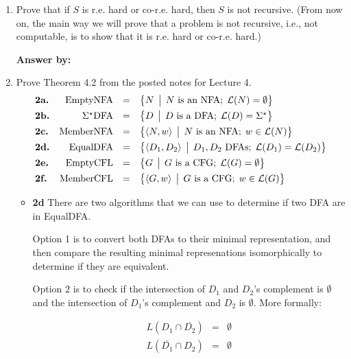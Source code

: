 \documentclass[12pt]{article}
\begin{document}
\noindent{}
\addtocounter{section}{1}

\begin{enumerate}
\item Prove that if $S$ is r.e. hard or co-r.e. hard, then $S$ is not recursive. (From now on, the main way we will
prove that a problem is not recursive, i.e., not computable, is to show that it is r.e. hard or co-r.e. hard.)

{\bf Answer by:} 

\item Prove Theorem 4.2 from the posted notes for Lecture 4.
\[
\begin{array}{lrcl}
\textbf{2a.}&\mbox{{\rm EmptyNFA}} &=& \bigl\{ N \,\bigm|\, N \mbox{ is an NFA};\; {\cal L}(N) = \emptyset \bigr\} \\[1ex]
\textbf{2b.}&\Sigma^\star\mbox{{\rm DFA}} &=& \bigl\{ D \,\bigm|\, D\mbox{ is a DFA};\;
  {\cal L}(D) = \Sigma^\star \bigr\}\\[1ex]
\textbf{2c.}&\mbox{{\rm MemberNFA}} &=& \bigl\{ \langle N,w \rangle \,\bigm|\, N \mbox{ is an NFA};\; w\in {\cal L}(N) \bigr\}\\[1ex]
\textbf{2d.}&\mbox{{\rm EqualDFA}} &=& \bigl\{ \langle D_1,D_2 \rangle \,\bigm|\, D_1,D_2 \mbox{ DFAs};\;{\cal L}(D_1) ={\cal L}(D_2) \bigr\}\\[1ex]
\textbf{2e.}&\mbox{{\rm EmptyCFL}} &=& \bigl\{ G \,\bigm|\, G \mbox{ is a CFG};\; {\cal L}(G) =
  \emptyset \bigr\} \\[1ex] 
\textbf{2f.}&\mbox{{\rm MemberCFL}} &=& \bigl\{ \langle G,w \rangle \,\bigm|\, G \mbox{ is a CFG};\;w\in{\cal L}(G) \bigr\}\\
\end{array}
\]

\begin{itemize}
\item \textbf{2d} There are two algorithms that we can use to determine if two DFA are in EqualDFA. 

Option 1 is to convert both DFAs to their minimal representation, and then compare the resulting minimal represenations isomorphically to determine if they are equivalent.

Option 2 is to check if the intersection of $D_1$ and $D_2$'s complement is $\emptyset$ and the intersection of $D_1$'s complement and $D_2$ is $\emptyset$. More formally:

\[
\begin{array}{lcr}
L(D_1 \cap \overline{D_2}) & = & \emptyset \\
L(\overline{D_1} \cap D_2) & = & \emptyset \\
\end{array} 
\]


\end{itemize}
\end{enumerate}
\end{document}
